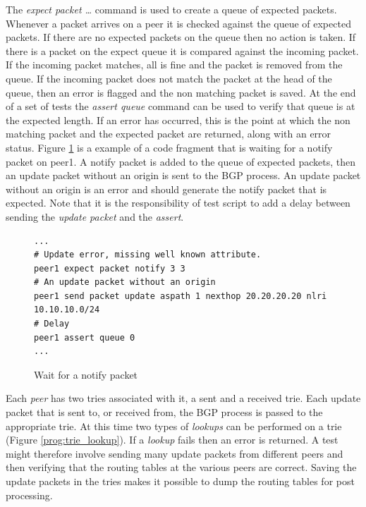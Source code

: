 \documentclass[11pt]{article}
\begin{document}

The {\em expect packet \ldots} command is used to create a queue of
expected packets. Whenever a packet arrives on a peer it is checked
against the queue of expected packets. If there are no expected packets
on the queue then no action is taken. If there is a packet on the
expect queue it is compared against the incoming packet. If the
incoming packet matches,
all is fine and the packet is removed from the queue. If the incoming
packet does not match the packet at the head of the queue, then an
error is flagged and the non matching packet is saved. At the end of a
set of tests the {\em assert queue} command can be used to verify that
queue is at the expected length. If an error has occurred, this is the
point at which the non matching packet and the expected packet are
returned, along with an error status. Figure \ref{prog:assert} is a
example of a code fragment that is waiting for a notify packet on
peer1. A notify packet is added to the queue of expected
packets, then an update packet without an origin is sent to the BGP
process. An update packet without an origin is an error and should
generate the notify packet that is expected. Note that it is
the responsibility of test script to add a delay between sending the
{\em update packet} and the {\em assert}.

\begin{figure}[htbp]
\small
\begin{verbatim}
...
# Update error, missing well known attribute.
peer1 expect packet notify 3 3
# An update packet without an origin
peer1 send packet update aspath 1 nexthop 20.20.20.20 nlri 10.10.10.0/24
# Delay
peer1 assert queue 0
...
\end{verbatim}
\vspace{-0.1in}
\caption{\label{prog:assert}Wait for a notify packet}
\end{figure}

Each {\em peer} has two tries associated with it, a sent and a
received trie. Each update packet that is sent to, or received from,
the BGP process is passed to the appropriate trie. At this time two
types of {\em lookups} can be performed on a trie (Figure
\ref{prog:trie_lookup}). If a {\em lookup} fails then an error is
returned. A test might therefore involve sending many update packets
from different peers and then verifying that the routing tables at the
various peers are correct.  Saving the update packets in the tries
makes it possible to dump the routing tables for post processing.
\end{document}

